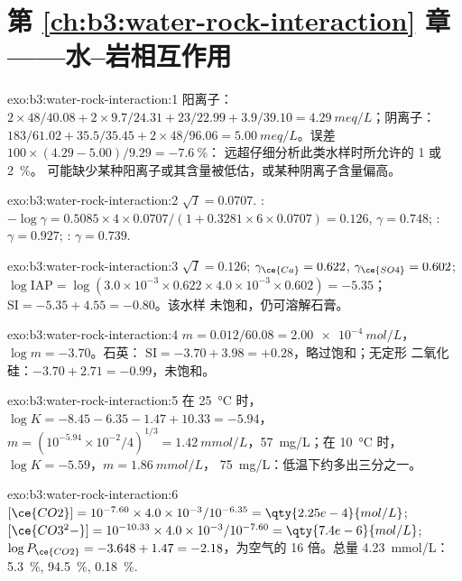 \section*{第 \ref{ch:b3:water-rock-interaction} 章——水–岩相互作用}

\begin{solution}{exo:b3:water-rock-interaction:1}
阳离子：$2\times48/40.08 + 2\times9.7/24.31 + 23/22.99 + 3.9/39.10 =
\qty{4.29}{meq/L}$；阴离子：$183/61.02 + 35.5/35.45 + 2\times48/96.06 =
\qty{5.00}{meq/L}$。误差 $100\times(4.29 - 5.00)/9.29 = \qty{-7.6}{\percent}$：
远超仔细分析此类水样时所允许的 1 或 \qty{2}{\percent}。
可能缺少某种阳离子或其含量被低估，或某种阴离子含量偏高。
\end{solution}

\begin{solution}{exo:b3:water-rock-interaction:2}
$\sqrt I = 0.0707$. : $-\log\gamma = 0.5085\times4\times0.0707/(1 +
0.3281\times6\times0.0707) = 0.126$, $\gamma = 0.748$; : $\gamma =
0.927$; : $\gamma = 0.739$.
\end{solution}

\begin{solution}{exo:b3:water-rock-interaction:3}
$\sqrt I = 0.126$; $\gamma_{\ce{Ca}} = 0.622$, $\gamma_{\ce{SO4}} = 0.602$;
$\log\mathrm{IAP} = \log(3.0\times10^{-3}\times0.622\times4.0\times10^{-3}
\times0.602) = -5.35$；$\mathrm{SI} = -5.35 + 4.55 = -0.80$。该水样
未饱和，仍可溶解石膏。
\end{solution}

\begin{solution}{exo:b3:water-rock-interaction:4}
$m = 0.012/60.08 = \qty{2.00e-4}{mol/L}$，$\log m = -3.70$。石英：
$\mathrm{SI} = -3.70 + 3.98 = +0.28$，略过饱和；无定形
二氧化硅：$-3.70 + 2.71 = -0.99$，未饱和。
\end{solution}

\begin{solution}{exo:b3:water-rock-interaction:5}
在 \qty{25}{\celsius} 时，$\log K = -8.45 - 6.35 - 1.47 + 10.33 = -5.94$，$m =
(10^{-5.94}\times10^{-2}/4)^{1/3} = \qty{1.42}{mmol/L}$，\qty{57}{mg/L}；在
\qty{10}{\celsius} 时，$\log K = -5.59$，$m = \qty{1.86}{mmol/L}$，
\qty{75}{mg/L}：低温下约多出三分之一。
\end{solution}

\begin{solution}{exo:b3:water-rock-interaction:6}
$[\ce{CO2}] = 10^{-7.60}\times4.0\times10^{-3}/10^{-6.35} =
\qty{2.25e-4}{mol/L}$; $[\ce{CO3^2-}] = 10^{-10.33}\times4.0\times10^{-3}/
10^{-7.60} = \qty{7.4e-6}{mol/L}$; $\log P_{\ce{CO2}} = -3.648 + 1.47 =
-2.18$，为空气的 16 倍。总量 \qty{4.23}{mmol/L}：
\qty{5.3}{\percent},  \qty{94.5}{\percent}, 
\qty{0.18}{\percent}.
\end{solution}

